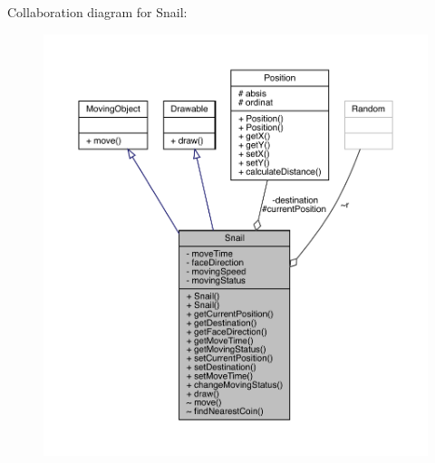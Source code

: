 Collaboration diagram for Snail\+:
\nopagebreak
\begin{figure}[H]
\begin{center}
\leavevmode
\includegraphics[width=350pt]{class_snail__coll__graph}
\end{center}
\end{figure}
